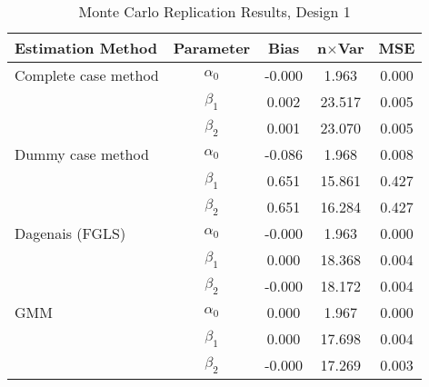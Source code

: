 \begin{table}
\centering
\caption{Monte Carlo Replication Results, Design 1}
\label{table:MCReplicationResultsDesign1}
\begin{tabular}{lcccc}
\toprule
Estimation Method & Parameter & Bias & n$\times$Var & MSE \\
\midrule
Complete case method & $\alpha_0$ & -0.000 & 1.963 & 0.000 \\
 & $\beta_1$ & 0.002 & 23.517 & 0.005 \\
 & $\beta_2$ & 0.001 & 23.070 & 0.005 \\
Dummy case method & $\alpha_0$ & -0.086 & 1.968 & 0.008 \\
 & $\beta_1$ & 0.651 & 15.861 & 0.427 \\
 & $\beta_2$ & 0.651 & 16.284 & 0.427 \\
Dagenais (FGLS) & $\alpha_0$ & -0.000 & 1.963 & 0.000 \\
 & $\beta_1$ & 0.000 & 18.368 & 0.004 \\
 & $\beta_2$ & -0.000 & 18.172 & 0.004 \\
GMM & $\alpha_0$ & 0.000 & 1.967 & 0.000 \\
 & $\beta_1$ & 0.000 & 17.698 & 0.004 \\
 & $\beta_2$ & -0.000 & 17.269 & 0.003 \\
\bottomrule
\end{tabular}
\end{table}
